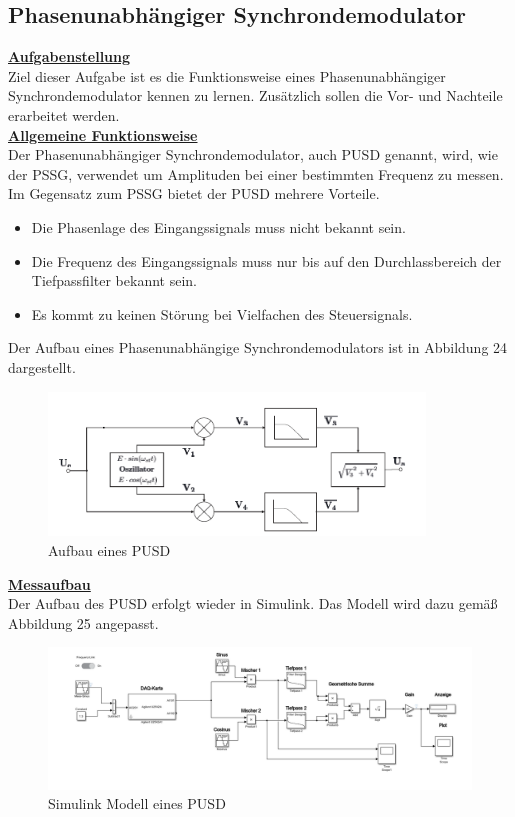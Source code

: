 \documentclass[a4paper,12pt]{article}
\begin{document}
	\subsection{Phasenunabhängiger Synchrondemodulator}
	\underline{\textbf{Aufgabenstellung}} \\ \newline
	\noindent
	Ziel dieser Aufgabe ist es die Funktionsweise eines Phasenunabhängiger Synchrondemodulator kennen zu lernen. Zusätzlich sollen die Vor- und Nachteile erarbeitet werden.\\ \newline
	\underline{\textbf{Allgemeine Funktionsweise}} \\ \newline
	\noindent
	Der Phasenunabhängiger Synchrondemodulator, auch PUSD genannt, wird, wie der PSSG, verwendet um Amplituden bei einer bestimmten Frequenz zu messen.\newline
	Im Gegensatz zum PSSG bietet der PUSD mehrere Vorteile.
	\begin{itemize}
		\item Die Phasenlage des Eingangssignals muss nicht bekannt sein.
		\item Die Frequenz des Eingangssignals muss nur bis auf den Durchlassbereich der Tiefpassfilter bekannt sein.
		\item Es kommt zu keinen Störung bei Vielfachen des Steuersignals.
	\end{itemize}
	Der Aufbau eines Phasenunabhängige Synchrondemodulators ist in Abbildung 24 dargestellt.\newline
	\begin{figure}[H]
		\centering
		\includegraphics[width=10cm]{assets/pusd}
		\caption{Aufbau eines PUSD}
	\end{figure}
	\noindent
	\underline{\textbf{Messaufbau}} \\ \newline
	\noindent
	Der Aufbau des PUSD erfolgt wieder in Simulink. Das Modell wird dazu gemäß Abbildung 25 angepasst.
	\begin{figure}[H]
		\centering
		\includegraphics[width=15cm]{assets/pusd-modell}
		\caption{Simulink Modell eines PUSD}
	\end{figure}
\end{document}
